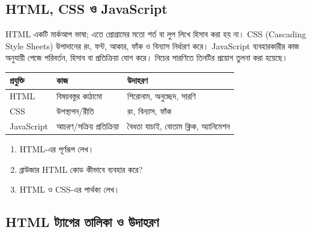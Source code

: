 \begin{center}
\end{center}



\subsection{HTML, CSS ও JavaScript}
HTML একটি মার্কআপ ভাষা; এতে প্রোগ্রামের মতো শর্ত বা লুপ লিখে হিসাব করা হয় না। CSS (Cascading Style Sheets) উপাদানের রং, ফন্ট, আকার, ফাঁক ও বিন্যাস নির্ধারণ করে। JavaScript ব্যবহারকারীর কাজ অনুযায়ী পেজে পরিবর্তন, হিসাব বা প্রতিক্রিয়া যোগ করে। নিচের সারণিতে তিনটির প্রয়োগ তুলনা করা হয়েছে।
\begin{center}
\begin{tabular}{|p{}|p{}|p{}|}
\hline
\textbf{প্রযুক্তি} & \textbf{কাজ} & \textbf{উদাহরণ} \\
\hline
HTML & বিষয়বস্তুর কাঠামো & শিরোনাম, অনুচ্ছেদ, সারণি \\
\hline
CSS & উপস্থাপন/রীতি & রং, বিন্যাস, ফাঁক \\
\hline
JavaScript & আচরণ/সক্রিয় প্রতিক্রিয়া & বৈধতা যাচাই, বোতাম ক্লিক, অ্যানিমেশন \\
\hline
\end{tabular}
\end{center}





\begin{practicebox}
\begin{enumerate}
\item HTML-এর পূর্ণরূপ লেখ।
\item ব্রাউজার HTML কোড কীভাবে ব্যবহার করে?
\item HTML ও CSS-এর পার্থক্য লেখ।
\end{enumerate}
\end{practicebox}



\subsection{HTML ট্যাগের তালিকা ও উদাহরণ}

